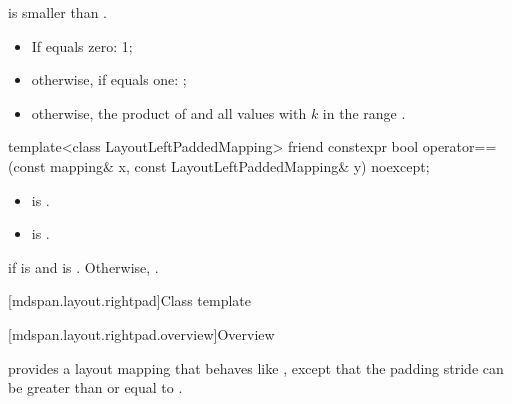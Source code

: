 \begin{itemdescr}
\pnum
\expects
{} is smaller than .

\pnum
\returns
\begin{itemize}
\item
If  equals zero: 1;
\item
otherwise, if  equals one: ;
\item
otherwise, the product of  and
all values  with $k$ in the range .
\end{itemize}
\end{itemdescr}

\begin{itemdecl}
template<class LayoutLeftPaddedMapping>
  friend constexpr bool operator==(const mapping& x, const LayoutLeftPaddedMapping& y) noexcept;
\end{itemdecl}

\begin{itemdescr}
\pnum
\constraints
\begin{itemize}
\item
{}
is .
\item
{} is .
\end{itemize}

\pnum
\returns
{} if  is  and
 is .
Otherwise, .
\end{itemdescr}

[mdspan.layout.rightpad]{Class template }

[mdspan.layout.rightpad.overview]{Overview}

\pnum
{} provides a layout mapping
that behaves like ,
except that the padding stride 
can be greater than or equal to
.

